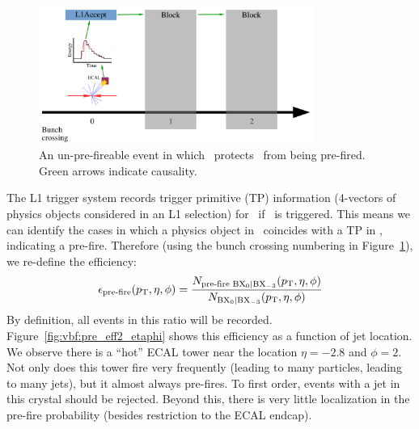 \begin{figure}
    \begin{center}
        \includegraphics[width=0.8\textwidth,page=3]{figures/vbf/triggers/l1diag.pdf}
        \caption{An un-pre-fireable event in which ~protects ~from being pre-fired. 
                 Green arrows indicate causality.}
        \label{fig:vbf:pre3}
    \end{center}
\end{figure}

The L1 trigger system records trigger primitive (TP) information (4-vectors of physics objects considered in an L1 selection) for ~if ~is triggered.
This means we can identify the cases in which a physics object in ~coincides with a TP in , indicating a pre-fire. 
Therefore (using the bunch crossing numbering in Figure~\ref{fig:vbf:pre3}), we re-define the efficiency:
\begin{equation}
    \epsilon_\text{pre-fire}(p_\mathrm{T},\eta,\phi) = \frac{N_\text{pre-fire \ensuremath{{\mathrm{BX}_{0}}}|\ensuremath{{\mathrm{BX}_{-3}}}}(p_\mathrm{T},\eta,\phi)}{N_\text{\ensuremath{{\mathrm{BX}_{0}}}|\ensuremath{{\mathrm{BX}_{-3}}}}(p_\mathrm{T},\eta,\phi)}
\end{equation}
By definition, all events in this ratio will be recorded. 
Figure~\ref{fig:vbf:pre_eff2_etaphi} shows this efficiency as a function of jet location. 
We observe there is a ``hot'' ECAL tower near the location $\eta=-2.8$ and $\phi=2$.
Not only does this tower fire very frequently (leading to many particles, leading to many jets), but it almost always pre-fires.
To first order, events with a jet in this crystal should be rejected.
Beyond this, there is very little localization in the pre-fire probability (besides restriction to the ECAL endcap). 


